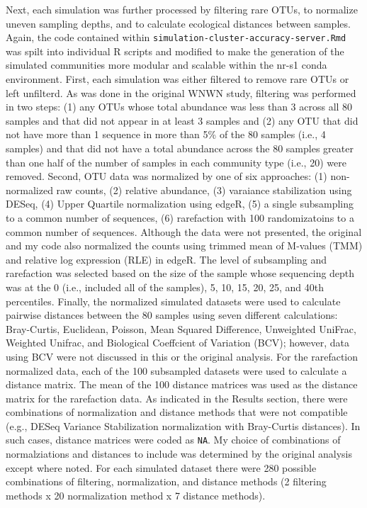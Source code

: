 \documentclass[
]{article}
\begin{document}
Next, each simulation was further processed by filtering rare OTUs, to
normalize uneven sampling depths, and to calculate ecological distances
between samples. Again, the code contained within
\texttt{simulation-cluster-accuracy-server.Rmd} was spilt into
individual R scripts and modified to make the generation of the
simulated communities more modular and scalable within the nr-s1 conda
environment. First, each simulation was either filtered to remove rare
OTUs or left unfilterd. As was done in the original WNWN study,
filtering was performed in two steps: (1) any OTUs whose total abundance
was less than 3 across all 80 samples and that did not appear in at
least 3 samples and (2) any OTU that did not have more than 1 sequence
in more than 5\% of the 80 samples (i.e., 4 samples) and that did not
have a total abundance across the 80 samples greater than one half of
the number of samples in each community type (i.e., 20) were removed.
Second, OTU data was normalized by one of six approaches: (1)
non-normalized raw counts, (2) relative abundance, (3) varaiance
stabilization using DESeq, (4) Upper Quartile normalization using edgeR,
(5) a single subsampling to a common number of sequences, (6)
rarefaction with 100 randomizatoins to a common number of sequences.
Although the data were not presented, the original and my code also
normalized the counts using trimmed mean of M-values (TMM) and relative
log expression (RLE) in edgeR. The level of subsampling and rarefaction
was selected based on the size of the sample whose sequencing depth was
at the 0 (i.e., included all of the samples), 5, 10, 15, 20, 25, and
40th percentiles. Finally, the normalized simulated datasets were used
to calculate pairwise distances between the 80 samples using seven
different calculations: Bray-Curtis, Euclidean, Poisson, Mean Squared
Difference, Unweighted UniFrac, Weighted Unifrac, and Biological
Coeffcient of Variation (BCV); however, data using BCV were not
discussed in this or the original analysis. For the rarefaction
normalized data, each of the 100 subsampled datasets were used to
calculate a distance matrix. The mean of the 100 distance matrices was
used as the distance matrix for the rarefaction data. As indicated in
the Results section, there were combinations of normalization and
distance methods that were not compatible (e.g., DESeq Variance
Stabilization normalization with Bray-Curtis distances). In such cases,
distance matrices were coded as \texttt{NA}. My choice of combinations
of normalziations and distances to include was determined by the
original analysis except where noted. For each simulated dataset there
were 280 possible combinations of filtering, normalization, and distance
methods (2 filtering methods x 20 normalization method x 7 distance
methods).
\end{document}
